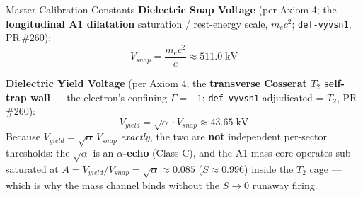 \begin{resultbox}{Master Calibration Constants}
\noindent\textbf{Dielectric Snap Voltage} (per Axiom 4; the \textbf{longitudinal A1 dilatation} saturation / rest-energy scale, $m_e c^2$; \texttt{def-vyvsn1}, PR\,\#260):
\begin{equation}
    V_{snap} = \frac{m_e c^2}{e} \approx 511.0\;\text{kV}
    \label{eq:cal_vsnap}
\end{equation}

\noindent\textbf{Dielectric Yield Voltage} (per Axiom 4; the \textbf{transverse Cosserat $T_2$ self-trap wall} --- the electron's confining $\Gamma = -1$\gammaundeclared{}; \texttt{def-vyvsn1} adjudicated = $T_2$, PR\,\#260):
\begin{equation}
    V_{yield} = \sqrt{\alpha} \cdot V_{snap} \approx 43.65\;\text{kV}
    \label{eq:cal_vyield}
\end{equation}
Because $V_{yield} = \sqrt{\alpha}\, V_{snap}$ \emph{exactly}, the two are \textbf{not} independent per-sector thresholds: the $\sqrt{\alpha}$ is an \textbf{$\alpha$-echo} (Class-C), and the A1 mass core operates sub-saturated at $A = V_{yield}/V_{snap} = \sqrt{\alpha} \approx 0.085$ ($S \approx 0.996$) inside the $T_2$ cage --- which is why the mass channel binds without the $S \to 0$ runaway firing.
\end{resultbox}
